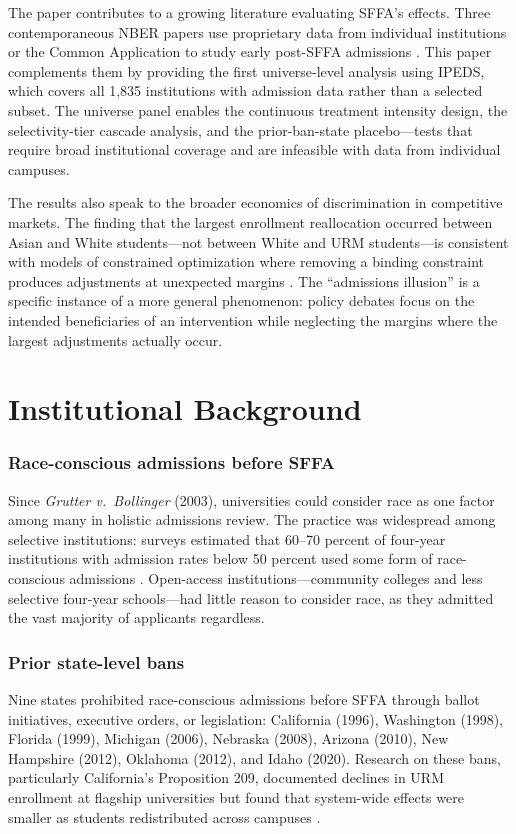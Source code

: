 \documentclass[12pt]{article}
\begin{document}
The paper contributes to a growing literature evaluating SFFA's effects. Three contemporaneous NBER papers use proprietary data from individual institutions or the Common Application to study early post-SFFA admissions \citep{bleemer_2024, arcidiacono_2024, dynarski_2024}. This paper complements them by providing the first universe-level analysis using IPEDS, which covers all 1,835 institutions with admission data rather than a selected subset. The universe panel enables the continuous treatment intensity design, the selectivity-tier cascade analysis, and the prior-ban-state placebo---tests that require broad institutional coverage and are infeasible with data from individual campuses.

The results also speak to the broader economics of discrimination in competitive markets. The finding that the largest enrollment reallocation occurred between Asian and White students---not between White and URM students---is consistent with models of constrained optimization where removing a binding constraint produces adjustments at unexpected margins \citep{becker_1957, fryer_loury_2005}. The ``admissions illusion'' is a specific instance of a more general phenomenon: policy debates focus on the intended beneficiaries of an intervention while neglecting the margins where the largest adjustments actually occur.

\section{Institutional Background}

\subsubsection*{Race-conscious admissions before SFFA} Since \textit{Grutter v.\ Bollinger} (2003), universities could consider race as one factor among many in holistic admissions review. The practice was widespread among selective institutions: surveys estimated that 60--70 percent of four-year institutions with admission rates below 50 percent used some form of race-conscious admissions \citep{espinosa_2019}. Open-access institutions---community colleges and less selective four-year schools---had little reason to consider race, as they admitted the vast majority of applicants regardless.

\subsubsection*{Prior state-level bans} Nine states prohibited race-conscious admissions before SFFA through ballot initiatives, executive orders, or legislation: California (1996), Washington (1998), Florida (1999), Michigan (2006), Nebraska (2008), Arizona (2010), New Hampshire (2012), Oklahoma (2012), and Idaho (2020). Research on these bans, particularly California's Proposition 209, documented declines in URM enrollment at flagship universities but found that system-wide effects were smaller as students redistributed across campuses \citep{bleemer_2022, hinrichs_2012, backes_2012}.
\end{document}
